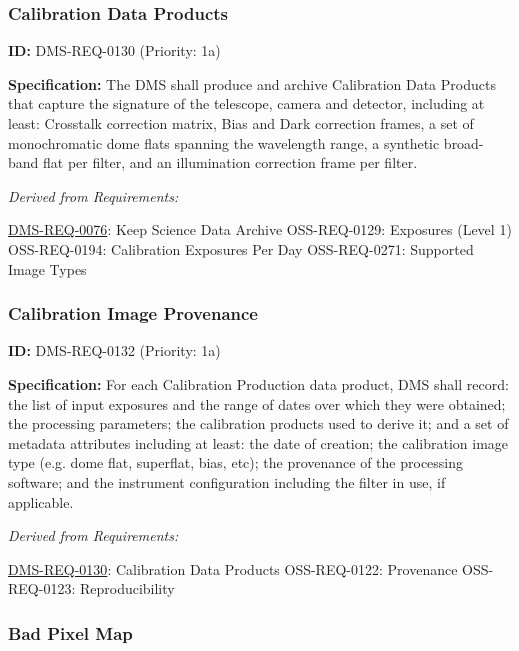 \documentclass[SE,toc,lsstdraft]{lsstdoc}
\begin{document}
\subsubsection{Calibration Data Products}

\label{DMS-REQ-0130}
\textbf{ID:} DMS-REQ-0130 (Priority: 1a)

\textbf{Specification:} The DMS shall produce and archive Calibration Data Products that capture the signature of the telescope, camera and detector, including at least: Crosstalk correction matrix, Bias and Dark correction frames, a set of monochromatic dome flats spanning the wavelength range, a synthetic broad-band flat per filter, and an illumination correction frame per filter.

\emph{Derived from Requirements:}

\hyperref[DMS-REQ-0076]{DMS-REQ-0076}:
Keep Science Data Archive \newline
OSS-REQ-0129:
Exposures (Level 1) \newline
OSS-REQ-0194:
Calibration Exposures Per Day \newline
OSS-REQ-0271:
Supported Image Types \newline

\subsubsection{Calibration Image Provenance}

\label{DMS-REQ-0132}
\textbf{ID:} DMS-REQ-0132 (Priority: 1a)

\textbf{Specification:} For each Calibration Production data product, DMS shall record: the list of input exposures and the range of dates over which they were obtained; the processing parameters; the calibration products used to derive it; and a set of metadata attributes including at least: the date of creation; the calibration image type (e.g. dome flat, superflat, bias, etc); the provenance of the processing software; and the instrument configuration including the filter in use, if applicable.

\emph{Derived from Requirements:}

\hyperref[DMS-REQ-0130]{DMS-REQ-0130}:
Calibration Data Products \newline
OSS-REQ-0122:
Provenance \newline
OSS-REQ-0123:
Reproducibility \newline

\subsubsection{Bad Pixel Map}
\end{document}
